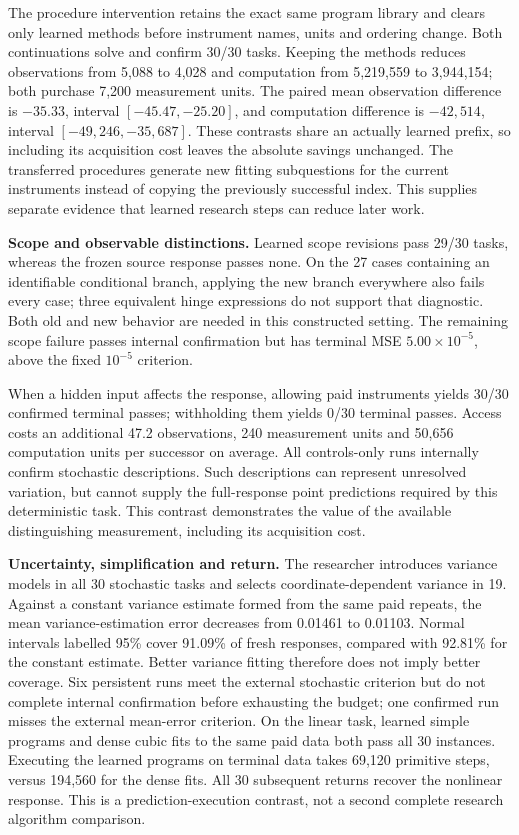 \documentclass[twoside,11pt]{article}
\begin{document}
The procedure intervention retains the exact same program library and clears
only learned methods before instrument names, units and ordering change. Both
continuations solve and confirm 30/30 tasks. Keeping the methods reduces
observations from 5,088 to 4,028 and computation from 5,219,559 to 3,944,154;
both purchase 7,200 measurement units. The paired mean observation difference is
\(-35.33\), interval \([-45.47,-25.20]\), and computation difference is \(-42{,}514\),
interval \([-49{,}246,-35{,}687]\). These contrasts share an actually learned prefix,
so including its acquisition cost leaves the absolute savings unchanged. The
transferred procedures generate new fitting subquestions for the current
instruments instead of copying the previously successful index. This supplies
separate evidence that learned research steps can reduce later work.


\textbf{Scope and observable distinctions.} Learned scope revisions pass 29/30 tasks,
whereas the frozen source response passes none. On the 27 cases containing an
identifiable conditional branch, applying the new branch everywhere also fails
every case; three equivalent hinge expressions do not support that diagnostic.
Both old and new behavior are needed in this constructed setting. The remaining
scope failure passes internal confirmation but has terminal MSE
\(5.00\times10^{-5}\), above the fixed \(10^{-5}\) criterion.


When a hidden input affects the response, allowing paid instruments yields
30/30 confirmed terminal passes; withholding them yields 0/30 terminal passes.
Access costs an additional 47.2 observations, 240 measurement units and 50,656
computation units per successor on average. All controls-only runs internally
confirm stochastic descriptions. Such descriptions can represent unresolved
variation, but cannot supply the full-response point predictions required by
this deterministic task. This contrast demonstrates the value of the available
distinguishing measurement, including its acquisition cost.


\textbf{Uncertainty, simplification and return.} The researcher introduces variance
models in all 30 stochastic tasks and selects coordinate-dependent variance in
19. Against a constant variance estimate formed from the same paid repeats, the
mean variance-estimation error decreases from 0.01461 to 0.01103. Normal intervals
labelled 95\% cover 91.09\% of fresh responses, compared with 92.81\% for the constant
estimate. Better variance fitting therefore does not imply better coverage. Six
persistent runs meet the external stochastic criterion but do not complete
internal confirmation before exhausting the budget; one confirmed run misses
the external mean-error criterion. On the linear task, learned simple programs
and dense cubic fits to the same paid data both pass all 30 instances. Executing
the learned programs on terminal data takes 69,120 primitive steps, versus
194,560 for the dense fits. All 30 subsequent returns recover the nonlinear
response. This is a prediction-execution contrast, not a second complete research
algorithm comparison.
\end{document}
